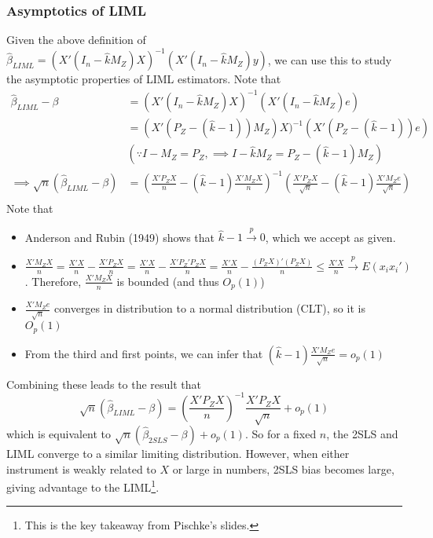 \documentclass[12pt]{article}
\theoremstyle{definition}
\theoremstyle{property}
\theoremstyle{assumption}
\theoremstyle{example}
\theoremstyle{comment}
\begin{document}
\subsubsection{Asymptotics of LIML}
Given the above definition of $\hat{\beta}_{LIML}=(X'(I_n-\hat{k}M_Z)X)^{-1}(X'(I_n-\hat{k}M_Z)y)$, we can use this to study the asymptotic properties of LIML estimators. Note that
\[
\begin{aligned}
\hat{\beta}_{LIML}-\beta &= (X'(I_n-\hat{k}M_Z)X)^{-1}(X'(I_n-\hat{k}M_Z)e)\\
& =(X'(P_Z-(\hat{k}-1))M_Z)X)^{-1}(X'(P_Z-(\hat{k}-1))e) \\
& (\because I-M_Z=P_Z, \implies I-\hat{k}M_Z=P_Z-(\hat{k}-1)M_Z)\\
 \implies \sqrt{n}(\hat{\beta}_{LIML}-\beta)&=\left(\frac{X'P_ZX}{n}-(\hat{k}-1)\frac{X'M_ZX}{n}\right)^{-1}\left(\frac{X'P_ZX}{\sqrt{n}}-(\hat{k}-1)\frac{X'M_Ze}{\sqrt{n}}\right)\\
\end{aligned}
\]
Note that
\begin{itemize}
\item Anderson and Rubin (1949) shows that $\hat{k}-1\xrightarrow{p}0$, which we accept as given. 
\item $\frac{X'M_ZX}{n}=\frac{X'X}{n}-\frac{X'P_ZX}{n}=\frac{X'X}{n}-\frac{X'P_Z'P_ZX}{n}=\frac{X'X}{n}-\frac{(P_ZX)'(P_ZX)}{n}\leq\frac{X'X}{n}\xrightarrow{p}E(x_ix_i')$. Therefore, $\frac{X'M_ZX}{n}$ is bounded (and thus $O_p(1)$)
\item $\frac{X'M_Ze}{\sqrt{n}}$ converges in distribution to a normal distribution (CLT), so it is $O_p(1)$
\item From the third and first points, we can infer that $(\hat{k}-1)\frac{X'M_Ze}{\sqrt{n}}=o_p(1)$
\end{itemize}\par
Combining these leads to the result that 
\[
 \sqrt{n}(\hat{\beta}_{LIML}-\beta) =\left(\frac{X'P_ZX}{n}\right)^{-1}\frac{X'P_ZX}{\sqrt{n}} +o_p(1)
\]
which is equivalent to $ \sqrt{n}(\hat{\beta}_{2SLS}-\beta) +o_p(1)$. So for a fixed $n$, the 2SLS and LIML converge to a similar limiting distribution. However, when either instrument is weakly related to $X$ or large in numbers, 2SLS bias becomes large, giving advantage to the LIML\footnote{This is the key takeaway from Pischke's slides. }.
\end{document}
